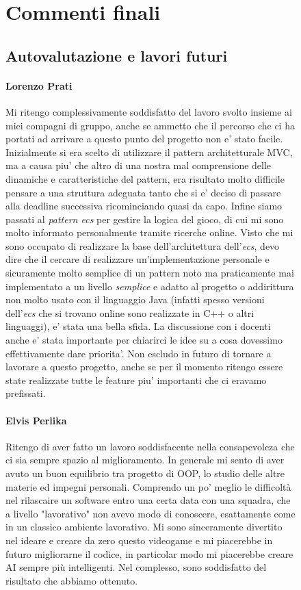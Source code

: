 \documentclass[a4paper,12pt]{report}
\begin{document}
\begin{figure}[h]
\chapter{Commenti finali}


\section{Autovalutazione e lavori futuri}

\subsubsection{Lorenzo Prati}

Mi ritengo complessivamente soddisfatto del lavoro svolto insieme ai miei compagni di gruppo, anche se ammetto che il percorso che ci ha portati ad arrivare a questo punto del progetto non e' stato facile. Inizialmente si era scelto di utilizzare il pattern architetturale MVC, ma a causa piu' che altro di una nostra mal comprensione delle dinamiche e caratteristiche del pattern, era risultato molto difficile pensare a una struttura adeguata tanto che si e' deciso di passare alla deadline successiva ricominciando quasi da capo. Infine siamo passati al \textit{pattern ecs} per gestire la logica del gioco, di cui mi sono molto informato personalmente tramite ricerche online. Visto che mi sono occupato di realizzare la base dell'architettura dell'\textit{ecs}, devo dire che il cercare di realizzare un'implementazione personale e sicuramente molto semplice di un pattern noto ma praticamente mai implementato a un livello \textit{semplice} e adatto al progetto o addirittura non molto usato con il linguaggio Java (infatti spesso versioni dell'\textit{ecs} che si trovano online sono realizzate in C++ o altri linguaggi), e' stata una bella sfida. La discussione con i docenti anche e' stata importante per chiarirci le idee su a cosa dovessimo effettivamente dare priorita'. Non escludo in futuro di tornare a lavorare a questo progetto, anche se per il momento ritengo essere state realizzate tutte le feature piu' importanti che ci eravamo prefissati.

\subsubsection{Elvis Perlika}
Ritengo di aver fatto un lavoro soddisfacente nella consapevoleza che ci sia sempre spazio
al miglioramento.
In generale mi sento di aver avuto un buon equilibrio tra progetto di OOP, lo studio delle
altre materie ed impegni personali.
Comprendo un po' meglio le difficoltà nel rilascaire un software entro una certa 
data con una squadra, che a livello "lavorativo" non avevo modo di conoscere, esattamente come
in un classico ambiente lavorativo. 
Mi sono sinceramente divertito nel ideare e creare da zero questo videogame e mi piacerebbe 
in futuro migliorarne il codice, in particolar modo mi piacerebbe creare AI sempre più intelligenti. 
Nel complesso, sono soddisfatto del risultato che abbiamo ottenuto.


\end{figure}
\end{document}
